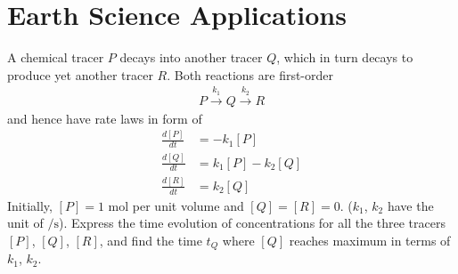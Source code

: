 \section{Earth Science Applications}

\begin{exmp}
A chemical tracer $P$ decays into another tracer $Q$, which in turn decays to produce yet another tracer $R$. Both reactions are first-order
\begin{align*}
P \xrightarrow{k_1} Q \xrightarrow{k_2} R
\end{align*}
and hence have rate laws in form of
\begin{align*}
\frac{d[P]}{dt} &= -k_1[P] \\
\frac{d[Q]}{dt} &= k_1[P] - k_2[Q] \\
\frac{d[R]}{dt} &= k_2[Q]
\end{align*}
Initially, $[P] = 1$ mol per unit volume and $[Q] = [R] = 0$. ($k_1$, $k_2$ have the unit of $\si{\per \s}$). Express the time evolution of concentrations for all the three tracers $[P]$, $[Q]$, $[R]$, and find the time $t_Q$ where $[Q]$ reaches maximum in terms of $k_1$, $k_2$.
\end{exmp}
